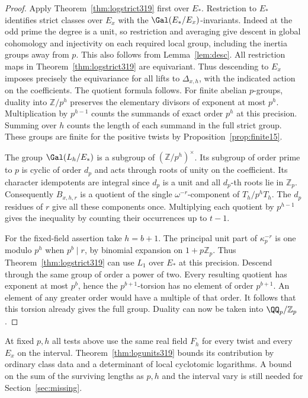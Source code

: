\documentclass[a4paper,11pt]{article}
\theoremstyle{definition}
\theoremstyle{remark}
\newcommand{\ZZ}{\mathbb Z}\newcommand{\ord}{\operatorname{ord}}
\numberwithin{equation}{section}
\begin{document}
\begin{proof}
Apply Theorem~\ref{thm:logstrict319} first over \(E_*\).
Restriction to \(E_*\) identifies strict classes over
\(E_x\) with the \(\Gal(E_*/E_x)\)-invariants. Indeed at
the odd prime the degree is a unit, so restriction and
averaging give descent in global cohomology and injectivity
on each required local group, including the inertia groups
away from \(p\). This also follows from Lemma~\ref{lem:desc}.
All restriction maps in Theorem~\ref{thm:logstrict319} are
equivariant. Thus descending to \(E_x\) imposes precisely
the equivariance for all lifts to \(\Delta_{x,h}\), with
the indicated action on the coefficients. The quotient
formula follows. For finite abelian \(p\)-groups,
duality into \(\ZZ/p^h\) preserves the elementary divisors
of exponent at most \(p^h\). Multiplication by \(p^{h-1}\)
counts the summands of exact order \(p^h\) at this
precision. Summing over \(h\) counts the length of each
summand in the full strict group. These groups are finite
for the positive twists by Proposition~\ref{prop:finite15}.

The group \(\Gal(L_h/E_*)\) is a subgroup of
\((\ZZ/p^h)^\times\). Its subgroup of order prime to \(p\)
is cyclic of order \(d_p\) and acts through roots of unity
on the coefficient. Its character idempotents are integral
since \(d_p\) is a unit and all \(d_p\)-th roots lie in
\(\ZZ_p\). Consequently \(B_{x,h,r}\) is a quotient of
the single \(\omega^{-r}\)-component of \(T_h/p^h T_h\).
The \(d_p\) residues of \(r\) give all these components
once. Multiplying each quotient by \(p^{h-1}\) gives the
inequality by counting their occurrences up to \(t-1\).

For the fixed-field assertion take \(h=b+1\). The principal
unit part of \(\kappa_p^{-r}\) is one modulo \(p^h\) when
\(p^b\mid r\), by binomial expansion on \(1+p\ZZ_p\).
Thus Theorem~\ref{thm:logstrict319} can use \(L_1\) over
\(E_*\) at this precision. Descend through the same group
of order a power of two. Every resulting quotient has
exponent at most \(p^b\), hence the \(p^{b+1}\)-torsion
has no element of order \(p^{b+1}\). An element of any
greater order would have a multiple of that order. It
follows that this torsion already gives the full group.
Duality can now be taken into \(\QQ_p/\ZZ_p\).
\end{proof}

At fixed \(p,h\) all tests above use the same real field
\(F_h\) for every twist and every \(E_x\) on the interval.
Theorem~\ref{thm:logunits319} bounds its contribution by
ordinary class data and a determinant of local cyclotomic
logarithms. A bound on the sum of the surviving lengths
as \(p,h\) and the interval vary is still needed for
Section~\ref{sec:missing}.
\end{document}
